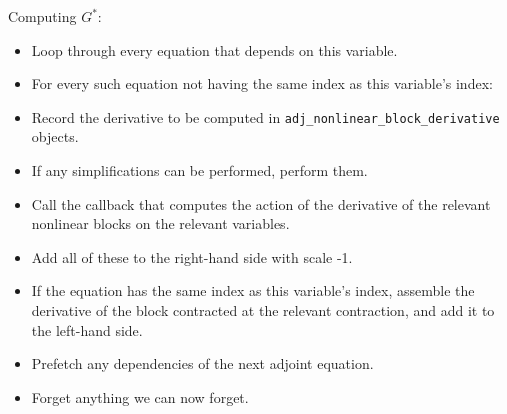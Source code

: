 \documentclass[10pt,authoryear]{elsarticle}
\begin{document}
Computing $G^{*}$:
\begin{itemize}
\item Loop through every equation that depends on this variable.
\item For every such equation not having the same index as this variable's index:
\item Record the derivative to be computed in \texttt{adj\_nonlinear\_block\_derivative} objects.
\item If any simplifications can be performed, perform them.
\item Call the callback that computes the action of the derivative of the relevant nonlinear blocks on the
relevant variables.
\item Add all of these to the right-hand side with scale -1.
\item If the equation has the same index as this variable's index, assemble the derivative of the block
contracted at the relevant contraction, and add it to the left-hand side.
\end{itemize}

\begin{itemize}
\item Prefetch any dependencies of the next adjoint equation.
\item Forget anything we can now forget.
\end{itemize}
\end{document}
